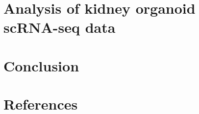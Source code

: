\documentclass[11pt,a4paper,titlepage,twoside,openright]{style/unimelbthesis}
\theoremstyle{definition}
\theoremstyle{definition}
\theoremstyle{definition}
\theoremstyle{remark}
\begin{document}
\begin{mainmatter}
\hypertarget{analysis-of-kidney-organoid-scrna-seq-data}{%
\chapter{Analysis of kidney organoid scRNA-seq data}\label{analysis-of-kidney-organoid-scrna-seq-data}}

\hypertarget{conclusion}{%
\chapter{Conclusion}\label{conclusion}}

\hypertarget{references}{%
\chapter*{References}\label{references}}

\hypertarget{refs}{}

\end{mainmatter}
\end{document}
